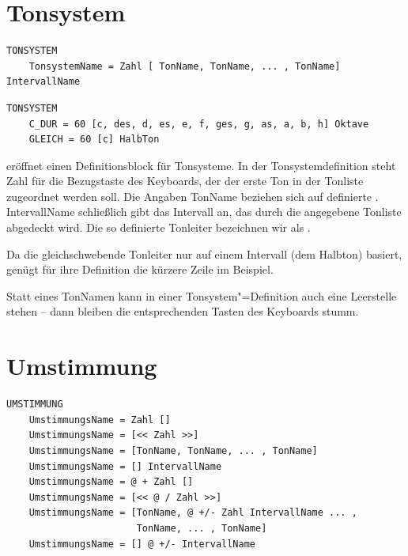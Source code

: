 \section{Tonsystem}
\label{sec:SX_TONESYSTEM}



\begin{verbatim}
TONSYSTEM
    TonsystemName = Zahl [ TonName, TonName, ... , TonName] IntervallName
\end{verbatim}




\begin{verbatim}
TONSYSTEM
    C_DUR = 60 [c, des, d, es, e, f, ges, g, as, a, b, h] Oktave 
    GLEICH = 60 [c] HalbTon
\end{verbatim}




 eröffnet einen Definitionsblock für Tonsysteme.  In der
Tonsystemdefinition steht Zahl für die Bezugstaste des Keyboards, der
der erste Ton in der Tonliste zugeordnet werden soll. Die Angaben
TonName beziehen sich auf definierte .
IntervallName schließlich gibt das Intervall an, das durch die
angegebene Tonliste abgedeckt wird. Die so definierte Tonleiter
bezeichnen wir als
.



Da die gleichschwebende Tonleiter nur auf einem Intervall (dem
Halbton) basiert, genügt für ihre Definition die kürzere Zeile im
Beispiel.


Statt eines TonNamen kann in einer Tonsystem"=Definition auch eine
Leerstelle stehen -- dann bleiben die entsprechenden Tasten des
Keyboards stumm.

\section{Umstimmung}
\label{sec:SX_RETUNING}


\begin{verbatim}
UMSTIMMUNG
    UmstimmungsName = Zahl [] 
    UmstimmungsName = [<< Zahl >>] 
    UmstimmungsName = [TonName, TonName, ... , TonName] 
    UmstimmungsName = [] IntervallName 
    UmstimmungsName = @ + Zahl [] 
    UmstimmungsName = [<< @ / Zahl >>] 
    UmstimmungsName = [TonName, @ +/- Zahl IntervallName ... ,
                       TonName, ... , TonName] 
    UmstimmungsName = [] @ +/- IntervallName
\end{verbatim}



